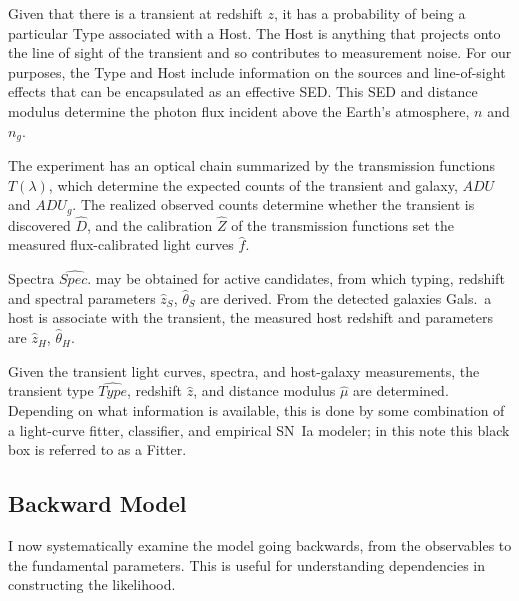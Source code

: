 \documentclass[preprint]{aastex}
\begin{document}
Given that there is a transient at redshift $z$, it has a probability of being a particular
Type associated with a Host. 
The Host is anything that projects onto the line of sight of the transient and so contributes
to measurement noise.   For our purposes, the Type and Host include information on the
sources and line-of-sight effects that can be encapsulated as an effective SED. 
This SED and distance modulus determine the photon flux incident above the Earth's
atmosphere, $n$ and $n_g$.

The experiment has an optical chain summarized by the transmission functions $T(\lambda)$, which determine the expected counts of the transient and galaxy, $\mathit{ADU}$ and
$\mathit{ADU}_g$.  
The realized observed counts determine whether the transient
is discovered $\hat{D}$, and the 
calibration $\hat{Z}$ of the transmission functions set the
measured flux-calibrated light curves $\hat{f}$.  

Spectra $\hat{\mathit{Spec.}}$ may be obtained for active candidates, from which typing, redshift and spectral parameters $\hat{z}_S$, $\hat{\theta}_S$ are derived.
From the detected galaxies Gals.\ a host is associate with the transient, the measured
host redshift and parameters are $\hat{z}_{H}$, $\hat{\theta}_H$.

Given the transient light curves, spectra, and host-galaxy measurements, the transient
type $\hat{\mathit{Type}}$, redshift $\hat{z}$, and distance modulus $\hat{\mu}$ are
determined.  Depending on what information is available, this is done by some combination
of a light-curve fitter, classifier, and empirical SN~Ia modeler; in this note this black box
is referred to as a Fitter.

\subsection{Backward Model}
 
I now systematically
examine the model going backwards, from the observables to the fundamental parameters.
This is useful for understanding dependencies in constructing the likelihood.
\end{document}
